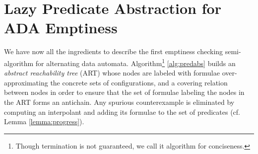 \documentclass[10pt,conference,letterpaper,twocolumn]{IEEEtran}
\begin{document}
\section{Lazy Predicate Abstraction for ADA Emptiness}

We have now all the ingredients to describe the first emptiness
checking semi-algorithm for alternating data
automata. Algorithm\footnote{Though termination is not guaranteed, we
  call it algorithm for conciseness.} \ref{alg:predabs} builds an
\emph{abstract reachability tree} (ART) whose nodes are labeled with
formulae over-approximating the concrete sets of configurations, and a
covering relation between nodes in order to ensure that the set of
formulae labeling the nodes in the ART forms an antichain. Any
spurious counterexample is eliminated by computing an interpolant and
adding its formulae to the set of predicates (cf. Lemma \ref{lemma:progress}).
\end{document}
